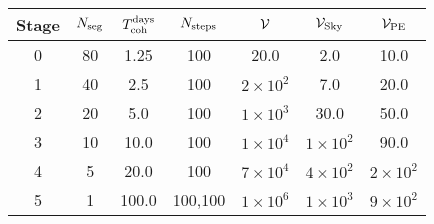 \begin{tabular}{c|cccccc}
Stage & $N_{\rm seg}$ & $T_{\rm coh}^{\rm days}$ &$N_{\rm steps}$ & $\mathcal{V}$ & $\mathcal{V}_{\rm Sky}$ & $\mathcal{V}_{\rm PE}$ \\ \hline
0 & 80 & 1.25 & 100 & 20.0 & 2.0 & 10.0 \\
1 & 40 & 2.5 & 100 & $2{\times}10^{2}$ & 7.0 & 20.0 \\
2 & 20 & 5.0 & 100 & $1{\times}10^{3}$ & 30.0 & 50.0 \\
3 & 10 & 10.0 & 100 & $1{\times}10^{4}$ & $1{\times}10^{2}$ & 90.0 \\
4 & 5 & 20.0 & 100 & $7{\times}10^{4}$ & $4{\times}10^{2}$ & $2{\times}10^{2}$ \\
5 & 1 & 100.0 & 100,100 & $1{\times}10^{6}$ & $1{\times}10^{3}$ & $9{\times}10^{2}$ \\
\end{tabular}
